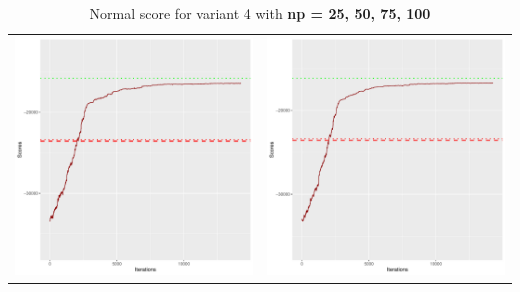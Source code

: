 \documentclass[]{scrartcl}
\begin{document}
\begin{table}[h!]
\begin{tabular}{cc}
\includegraphics[scale = 0.4]{./figs/win95pts/v4/75/boundsEvolution-14252.pdf} & 
\includegraphics[scale = 0.4]{./figs/win95pts/v4/100/boundsEvolution-14252.pdf} \\
\end{tabular}
\caption{Normal score for variant 4 with \textbf{np =  25, 50, 75, 100}}
\end{table}
\end{document}

